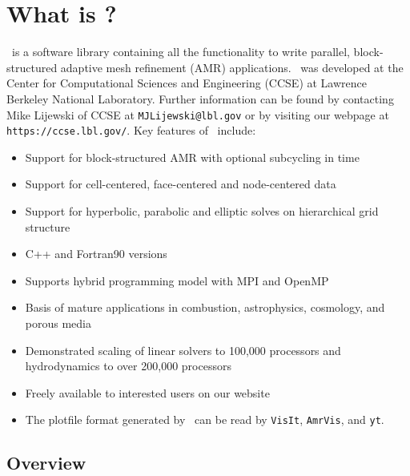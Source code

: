 \section{What is \BoxLib?}

\BoxLib\ is a software library containing all the functionality to write parallel, 
block-structured adaptive mesh refinement (AMR) applications.  \BoxLib\ was developed 
at the Center for Computational Sciences and Engineering (CCSE) at Lawrence Berkeley 
National Laboratory.  Further information can be found by contacting Mike Lijewski 
of CCSE at {\tt MJLijewski@lbl.gov} or by visiting our webpage
at {\tt https://ccse.lbl.gov/}.  Key features of \BoxLib\ include:

\begin{itemize}
\item Support for block-structured AMR with optional subcycling in time
\item Support for cell-centered, face-centered and node-centered data
\item Support for hyperbolic, parabolic and elliptic solves on hierarchical grid structure
\item C++ and Fortran90 versions
\item Supports hybrid programming model with MPI and OpenMP
\item Basis of mature applications in combustion, astrophysics, cosmology, and porous media
\item Demonstrated scaling of linear solvers to 100,000 processors and 
      hydrodynamics to over 200,000 processors
\item Freely available to interested users on our website
\item The plotfile format generated by \BoxLib\ can be read by {\tt VisIt}, {\tt AmrVis},
      and {\tt yt}.
\end{itemize}

\subsection{Overview}


